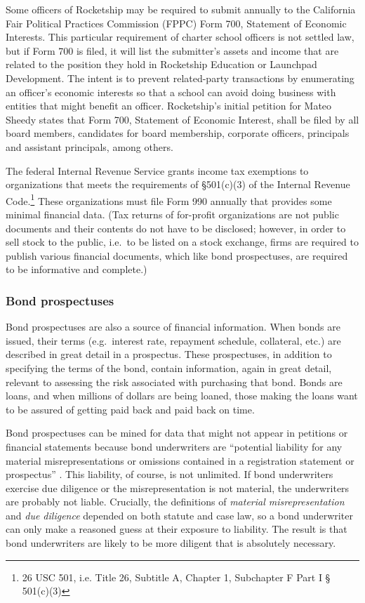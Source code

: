Some officers of Rocketship may be required to submit annually to the California Fair Political Practices Commission (FPPC) Form 700, Statement of Economic Interests. This particular requirement of charter school officers is not settled law, but if Form 700 is filed, it will list the submitter's assets and income that are related to the position they hold in Rocketship Education or Launchpad Development. The intent is to prevent related-party transactions by enumerating an officer's economic interests so that a school can avoid doing business with entities that might benefit an officer. Rocketship's initial petition for Mateo Sheedy states that Form 700, Statement of Economic Interest, shall be filed by all board members, candidates for board membership, corporate officers, principals and assistant principals, among others. 

The federal Internal Revenue Service grants income tax exemptions to organizations that meets the requirements of §501(c)(3) of the  Internal Revenue Code.\footnote{26 USC 501, i.e. Title 26, Subtitle A, Chapter 1, Subchapter F Part I § 501(c)(3)} These organizations must file Form 990 annually that provides some minimal financial data. (Tax returns of for-profit organizations are not public documents and their contents do not have to be disclosed; however, in order to sell stock to the public, i.e.~to be listed on a stock exchange, firms are required to publish various financial documents, which like bond prospectuses, are required to be informative and complete.) %

\subsubsection{Bond prospectuses}\indent

Bond prospectuses are also a source of financial information. When bonds are issued, their terms (e.g. interest rate, repayment schedule, collateral, etc.) are described in great detail in a prospectus. These prospectuses, in addition to specifying the terms of the bond, contain information, again in great detail, relevant to assessing the risk associated with purchasing that bond. Bonds are loans, and when millions of dollars are being loaned, those making the loans want to be assured of getting paid back and paid back on time.

Bond prospectuses can be mined for data that might not appear in petitions or financial statements because bond underwriters are ``potential liability for any material misrepresentations or omissions contained in a registration statement or prospectus'' \parencite{Block.etal2008}. This liability, of course, is not unlimited. If bond underwriters exercise due diligence or the misrepresentation is not material, the underwriters are probably not liable. Crucially, the definitions of \textit{material misrepresentation} and \textit{due diligence} depended on both statute and case law, so a bond underwriter can only make a reasoned guess at their exposure to liability. The result is that bond underwriters are likely to be more diligent that is absolutely necessary.


